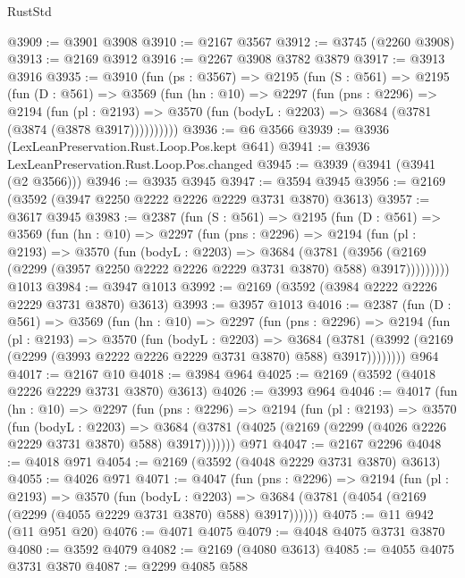 \begin{lexlean}{RustStd}
\begin{coremodule}
{\begin{coremodule}
{{{{{{{{{{{{{{{@3909 := @3901 @3908
@3910 := @2167 @3567
@3912 := @3745 (@2260 @3908)
@3913 := @2169 @3912
@3916 := @2267 @3908 @3782 @3879
@3917 := @3913 @3916
@3935 := @3910
    (fun (ps : @3567) =>
    @2195
      (fun (S : @561) =>
      @2195
        (fun (D : @561) =>
        @3569
          (fun (hn : @10) =>
          @2297
            (fun (pns : @2296) =>
            @2194
              (fun (pl : @2193) =>
              @3570 (fun (bodyL : @2203) => @3684 (@3781 (@3874 (@3878 @3917))))))))))
@3936 := @6 @3566
@3939 := @3936 (LexLeanPreservation.Rust.Loop.Pos.kept @641)
@3941 := @3936 LexLeanPreservation.Rust.Loop.Pos.changed
@3945 := @3939 (@3941 (@3941 (@2 @3566)))
@3946 := @3935 @3945
@3947 := @3594 @3945
@3956 := @2169 (@3592 (@3947 @2250 @2222 @2226 @2229 @3731 @3870) @3613)
@3957 := @3617 @3945
@3983 := @2387
    (fun (S : @561) =>
    @2195
      (fun (D : @561) =>
      @3569
        (fun (hn : @10) =>
        @2297
          (fun (pns : @2296) =>
          @2194
            (fun (pl : @2193) =>
            @3570
              (fun (bodyL : @2203) =>
              @3684
                (@3781
                  (@3956
                    (@2169 (@2299 (@3957 @2250 @2222 @2226 @2229 @3731 @3870) @588) @3917)))))))))
    @1013
@3984 := @3947 @1013
@3992 := @2169 (@3592 (@3984 @2222 @2226 @2229 @3731 @3870) @3613)
@3993 := @3957 @1013
@4016 := @2387
    (fun (D : @561) =>
    @3569
      (fun (hn : @10) =>
      @2297
        (fun (pns : @2296) =>
        @2194
          (fun (pl : @2193) =>
          @3570
            (fun (bodyL : @2203) =>
            @3684
              (@3781 (@3992 (@2169 (@2299 (@3993 @2222 @2226 @2229 @3731 @3870) @588) @3917))))))))
    @964
@4017 := @2167 @10
@4018 := @3984 @964
@4025 := @2169 (@3592 (@4018 @2226 @2229 @3731 @3870) @3613)
@4026 := @3993 @964
@4046 := @4017
    (fun (hn : @10) =>
    @2297
      (fun (pns : @2296) =>
      @2194
        (fun (pl : @2193) =>
        @3570
          (fun (bodyL : @2203) =>
          @3684 (@3781 (@4025 (@2169 (@2299 (@4026 @2226 @2229 @3731 @3870) @588) @3917)))))))
    @971
@4047 := @2167 @2296
@4048 := @4018 @971
@4054 := @2169 (@3592 (@4048 @2229 @3731 @3870) @3613)
@4055 := @4026 @971
@4071 := @4047
    (fun (pns : @2296) =>
    @2194
      (fun (pl : @2193) =>
      @3570
        (fun (bodyL : @2203) =>
        @3684 (@3781 (@4054 (@2169 (@2299 (@4055 @2229 @3731 @3870) @588) @3917))))))
@4075 := @11 @942 (@11 @951 @20)
@4076 := @4071 @4075
@4079 := @4048 @4075 @3731 @3870
@4080 := @3592 @4079
@4082 := @2169 (@4080 @3613)
@4085 := @4055 @4075 @3731 @3870
@4087 := @2299 @4085 @588
}}}}}}}}}}}}}}}
\end{coremodule}}
\end{coremodule}
\end{lexlean}

